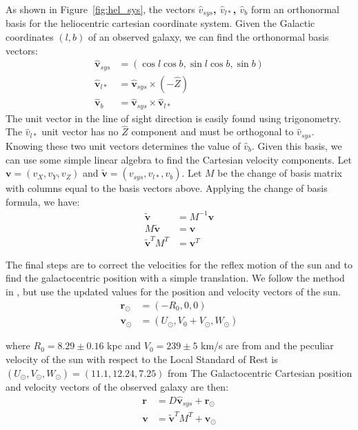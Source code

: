 \documentclass[iop,apj,twocolappendix,numberedappendix]{emulateapj}
\def\Fref#1{Figure~\ref{#1}}
\begin{document}
As shown in \Fref{fig:hel_sys}, the vectors \textbf{$\hat{v}_{sys}$, $\hat{v}_{l*}$, $\hat{v}_{b}$} form an orthonormal basis for the heliocentric cartesian coordinate system. 
Given the Galactic coordinates $(l,b)$ of an observed galaxy, we can find the orthonormal basis vectors:
\begin{equation}
\begin{aligned}
\mathbf{\hat{v}}_{sys}&=(\cos l\cos b, \sin l\cos b, \sin b)\\
\mathbf{\hat{v}}_{l*}&=\mathbf{\hat{v}}_{sys}\times(-\hat{Z})\\
\mathbf{\hat{v}}_{b}&=\mathbf{\hat{v}}_{sys}\times\mathbf{\hat{v}}_{l*}
\end{aligned}
\end{equation}
The unit vector in the line of sight direction is easily found using trigonometry. The $\hat{v}_{l*}$ unit vector has no $\hat{Z}$ component and must be orthogonal to $\hat{v}_{sys}$. Knowing these two unit vectors determines the value of $\hat{v}_{b}$.
Given this basis, we can use some simple linear algebra to find the Cartesian velocity components. 
Let $\mathbf{v}=(v_{X}, v_{Y}, v_{Z})$ and $\mathbf{\tilde{v}}=(v_{sys}, v_{l*}, v_{b})$. 
Let $M$ be the change of basis matrix with columns equal to the basis vectors above. 
Applying the change of basis formula, we have:
\begin{equation}
\begin{aligned}
\mathbf{\tilde{v}}&=M^{-1}\mathbf{v}\\
M\mathbf{\tilde{v}}&=\mathbf{v}\\
\mathbf{\tilde{v}}^{T}M^{T}&=\mathbf{v}^{T}
\end{aligned}
\end{equation}

The final steps are to correct the velocities for the reflex motion of the sun and to find the galactocentric position with a simple translation. 
We follow the method in \citep{van2002new}, but use the updated values for the position and velocity vectors of the sun.
\begin{equation}
\begin{aligned}
\mathbf{r}_{\odot} &= (-R_{0},0,0)\\
\mathbf{v}_{\odot} &= (U_{\odot}, V_{0}+V_{\odot}, W_{\odot})
\end{aligned}
\end{equation}

where $R_{0} = 8.29\pm 0.16$ kpc and $V_{0} = 239 \pm 5$ km/s are from 
\cite{mcmillan2011mass} 
and the peculiar velocity of the sun with respect to the Local Standard of Rest is $(U_{\odot}, V_{\odot}, W_{\odot}) = (11.1, 12.24, 7.25)$ from 
The Galactocentric Cartesian position and velocity vectors of the observed galaxy are then:
\begin{equation}
\begin{aligned}
\mathbf{r} &= D\mathbf{\hat{v}}_{sys} + \mathbf{r}_{\odot}\\
\mathbf{v} &= \mathbf{\tilde{v}}^{T}M^{T} + \mathbf{v}_{\odot}
\end{aligned}
\end{equation}
\end{document}
